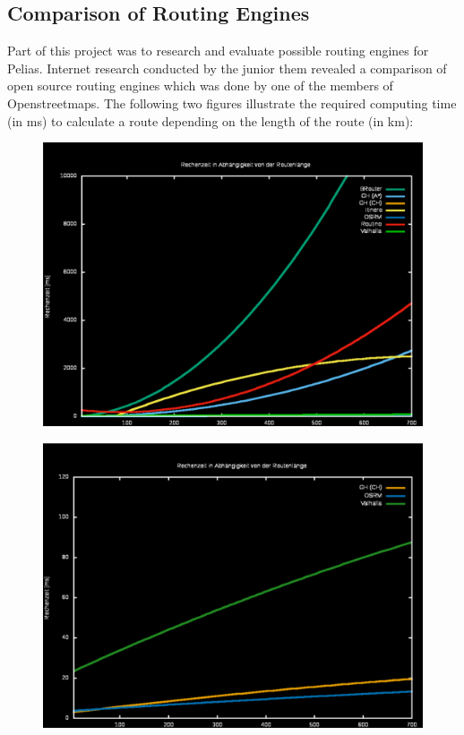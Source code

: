 \subsection{Comparison of Routing Engines}
Part of this project was to research and evaluate possible routing engines for Pelias. Internet research conducted by the junior them revealed a comparison of open source routing engines which was done by one of the members of Openstreetmaps. The following two figures illustrate the required computing time (in ms) to calculate a route depending on the length of the route (in km)\citep{Ramm2017}:
\begin{figure}[H]
\centering
\includegraphics[width=1.0\textwidth]{img/routing_comparison_01}
\label{fig:routing_comparison_01}
\end{figure}
\begin{figure}[H]
\centering
\includegraphics[width=1.0\textwidth]{img/routing_comparison_02}
\label{fig:routing_comparison_02}
\end{figure}
